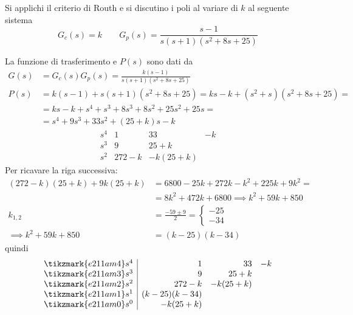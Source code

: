\begin{esercizio}[Parametrico] Si applichi il criterio di Routh e si discutino i
poli al variare di \(k\) al seguente sistema
\[
	G_c(s) = k \qquad G_p(s) = \frac{s-1}{s (s+1) (s^2 +8s +25)}
\]

La funzione di trasferimento e \(P(s)\) sono dati da
\begin{align*}
	G(s) &= G_c(s) G_p(s) = \frac{k(s-1)}{s (s+1) (s^2 +8s +25)} \\
	P(s) &= k(s-1) + s (s+1) (s^2 +8s +25) = ks -k +(s^2 +s)(s^2 +8s +25) = \\
	     &= ks -k +s^4 +s^3 +8s^3 +8s^2 +25s^2 +25s = \\
	     &= s^4 +9s^3 +33s^2 +(25+k)s -k
\end{align*}
\[\begin{array}{r|rrr}
	s^4 & 1 & 33 & -k \\
	s^3 & 9 & 25+k \\
	s^2 & 272-k & -k(25+k)
\end{array}\]
Per ricavare la riga successiva:
\begin{align*}
	(272-k)(25+k) + 9k(25+k) &= 6800 -25k +272k -k^2 +225k +9k^2 = \\
	&= 8k^2 +472k +6800 \implies k^2 +59k +850\\
	k_{1,2} &= \frac{-59 \pm 9}{2} = \begin{cases} -25 \\ -34 \end{cases} \\
	\implies k^2 +59k +850 &= (k-25)(k-34)
\end{align*}
quindi
\[\begin{array}{r|rrr}
	\tikzmark{e211am4} s^4 &     1 &       33 & -k 	\\
	\tikzmark{e211am3} s^3 &     9 &     25+k 	\\
	\tikzmark{e211am2} s^2 & 272-k & -k(25+k)	\\
	\tikzmark{e211am1} s^1 & (k-25)(k-34)		\\
	\tikzmark{e211am0} s^0 & -k(25+k)
\end{array}\]


\end{esercizio}
